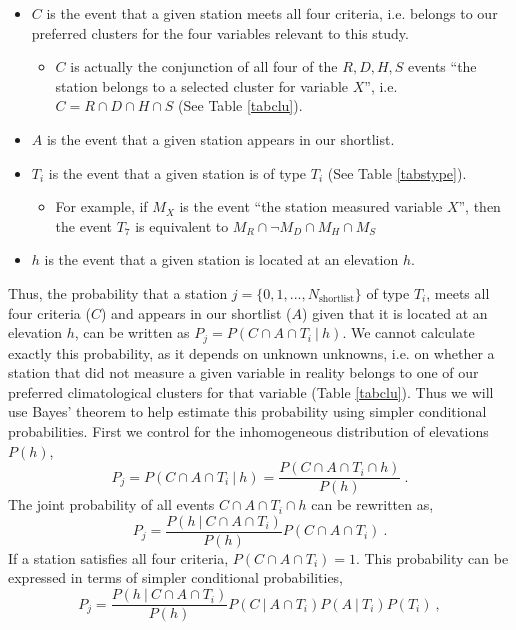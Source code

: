\documentclass[a4paper,fleqn,usenatbib]{mnras}
\begin{document}
\begin{itemize}
\item $C$ is the event that a given station meets all four criteria, i.e. belongs to our preferred clusters for the four variables relevant to this study.
\begin{itemize}
\item $C$ is actually the conjunction of all four of the $R,D,H,S$ events ``the station belongs to a selected cluster for variable $X$'', i.e. $C=R\cap D\cap H \cap S$ (See Table \ref{tabclu}).
\end{itemize}
\item $A$ is the event that a given station appears in our shortlist.
\item $T_i$ is the event that a given station is of type $T_i$ (See Table \ref{tabstype}).
\begin{itemize}
\item For example, if $M_X$ is the event ``the station measured variable $X$'', then the event $T_7$ is equivalent to $M_R\cap \neg M_D\cap M_H \cap M_S$
\end{itemize}
\item $h$ is the event that a given station is located at an elevation $h$.
\end{itemize}
Thus, the probability that a station $j=\{0,1,...,N_\mathrm{shortlist}\}$ of type $T_i$, meets all four criteria ($C$) and appears in our shortlist ($A$) given that it is located at an elevation $h$, can be written as $P_j=P(C\cap A\cap T_i\ |\ h)$. We cannot  calculate exactly this probability, as it depends on unknown unknowns, i.e. on whether a station that did not measure a given variable in reality belongs to one of our preferred climatological clusters for that variable (Table \ref{tabclu}). Thus we will use Bayes' theorem to help estimate this probability using simpler conditional probabilities. First we control for the inhomogeneous distribution of elevations $P(h)$,
\begin{equation}
P_j=P(C\cap A\cap T_i\ |\ h)=\frac{P(C\cap A\cap T_i\cap h)}{P(h)}\ .
\end{equation}
The joint probability of all events $C\cap A\cap T_i\cap h$ can be rewritten as,
\begin{equation}
P_j=\frac{P(h\ |\ C\cap A\cap T_i)}{P(h)}P(C\cap A\cap T_i)\ .
\end{equation}
If a station satisfies all four criteria, $P(C\cap A\cap T_i)=1$. This probability can be expressed in terms of simpler conditional probabilities,
\begin{equation}\label{peejay}
P_j=\frac{P(h\ |\ C\cap A\cap T_i)}{P(h)}P(C\ |\ A\cap T_i)P(A\ |\ T_i)P(T_i)\ ,
\end{equation}
\end{document}
